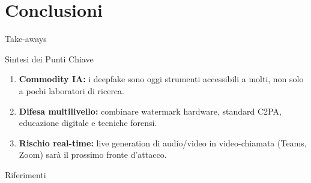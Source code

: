 \documentclass[12pt]{beamer}
\begin{document}
\section{Conclusioni}
\begin{frame}{Take-aways}
  \begin{alertblock}{Sintesi dei Punti Chiave}
    \begin{enumerate}
      \item \textbf{Commodity IA:} i deepfake sono oggi strumenti accessibili a molti, non solo a pochi laboratori di ricerca.
      \item \textbf{Difesa multilivello:} combinare watermark hardware, standard C2PA, educazione digitale e tecniche forensi.
      \item \textbf{Rischio real-time:} live generation di audio/video in video-chiamata (Teams, Zoom) sarà il prossimo fronte d’attacco.

    \end{enumerate}
  \end{alertblock}
\end{frame}

\begin{frame}[allowframebreaks]{Riferimenti}
\printbibliography[heading=none]
\end{frame}
\end{document}
